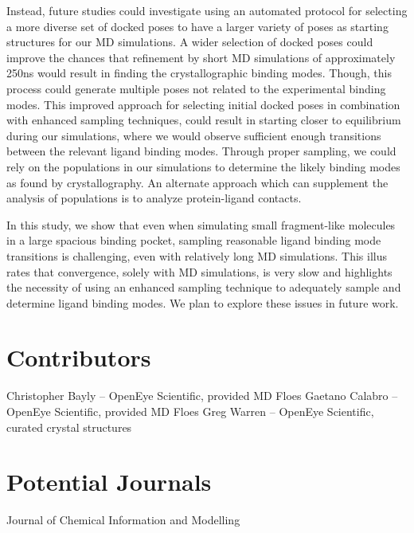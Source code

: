 \documentclass[journal=jcisd8,manuscript=article]{achemso}
\begin{document}
Instead, future studies could investigate using an automated protocol for selecting a more diverse set of docked poses to have a larger variety of poses as starting structures for our MD simulations.
A wider selection of docked poses could improve the chances that refinement by short MD simulations of approximately 250ns would result in finding the crystallographic binding modes. 
Though, this process could generate multiple poses not related to the experimental binding modes.
This improved approach for selecting initial docked poses in combination with enhanced sampling techniques, could result in starting closer to equilibrium during our simulations, where we would observe sufficient enough transitions between the relevant ligand binding modes.
Through proper sampling, we could rely on the populations in our simulations to determine the likely binding modes as found by crystallography.
An alternate approach which can supplement the analysis of populations is to analyze protein-ligand contacts.

In this study, we show that even when simulating small fragment-like molecules in a large spacious binding pocket, sampling reasonable ligand binding mode transitions is challenging, even with relatively long MD simulations.
This illus rates that convergence, solely with MD simulations, is very slow and highlights the necessity of using an enhanced sampling technique to adequately sample and determine ligand binding modes.
We plan to explore these issues in future work.

\section{Contributors}
Christopher Bayly -- OpenEye Scientific, provided MD Floes
Gaetano Calabro -- OpenEye Scientific, provided MD Floes
Greg Warren -- OpenEye Scientific,  curated crystal structures

\section{Potential Journals}
Journal of Chemical Information and Modelling


\end{document}
